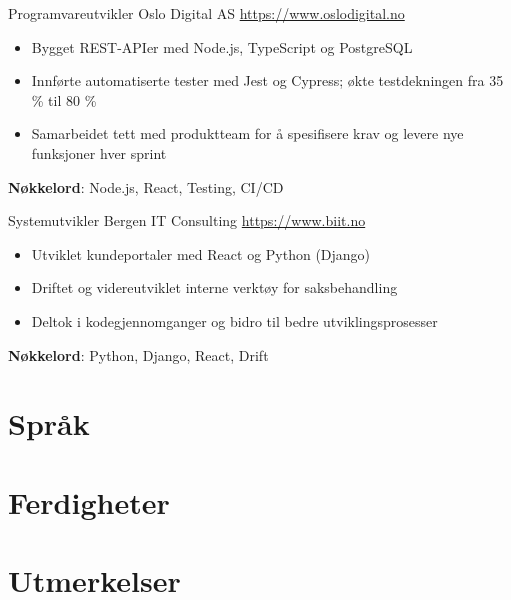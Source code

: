 \documentclass[a4paper, serif, 10pt]{moderncv}
\begin{document}
        {Programvareutvikler}
        {Oslo Digital AS}
        {\url{https://www.oslodigital.no}}
        {}
        {\begin{itemize}
\item Bygget REST-APIer med Node.js, TypeScript og PostgreSQL
\item Innførte automatiserte tester med Jest og Cypress; økte testdekningen fra 35 \% til 80 \%
\item Samarbeidet tett med produktteam for å spesifisere krav og levere nye funksjoner hver sprint
\end{itemize}
\textbf{Nøkkelord}: Node.js, React, Testing, CI/CD}

        {Systemutvikler}
        {Bergen IT Consulting}
        {\url{https://www.biit.no}}
        {}
        {\begin{itemize}
\item Utviklet kundeportaler med React og Python (Django)
\item Driftet og videreutviklet interne verktøy for saksbehandling
\item Deltok i kodegjennomganger og bidro til bedre utviklingsprosesser
\end{itemize}
\textbf{Nøkkelord}: Python, Django, React, Drift}
\section{Språk}

\section{Ferdigheter}

\section{Utmerkelser}
\end{document}
